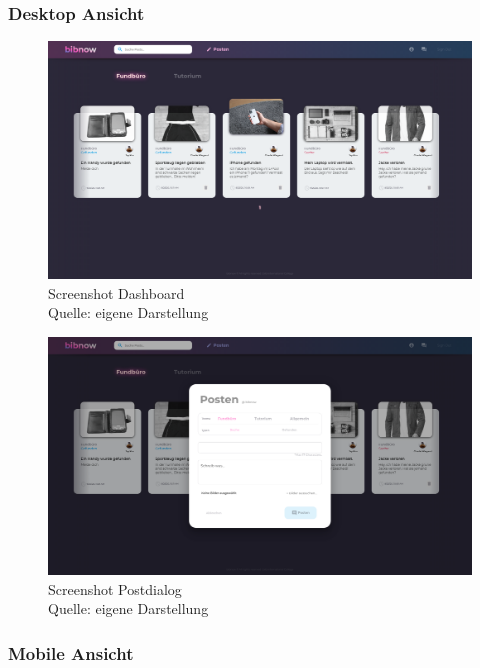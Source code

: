 \documentclass[12pt,titlepage]{article}
\begin{document}
\FloatBarrier
\newpage

\subsubsection{Desktop Ansicht}

\begin{figure}[hbt!]
\centering
\includegraphics[width=400pt]{screenshots/Screenshot_Desktop_Dashboard.png}
\caption[Sreenshot Dashboard]{Screenshot Dashboard \\Quelle: eigene Darstellung}
\end{figure}

\begin{figure}[hbt!]
\centering
\includegraphics[width=400pt]{screenshots/Screenshot_Desktop_Posten.png}
\caption[Sreenshot Postdialog]{Screenshot Postdialog\\Quelle: eigene Darstellung}
\end{figure}

\FloatBarrier
\newpage
\subsubsection{Mobile Ansicht}
\end{document}
